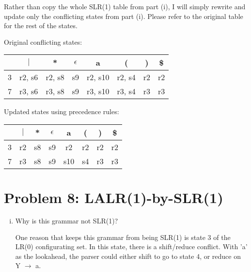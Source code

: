 \documentclass{article}
\begin{document}
\begin{enumerate}[i.]
		Rather than copy the whole SLR(1) table from part (i), I will
		simply rewrite and update only the conflicting states from part
		(i). Please refer to the original table for the rest of the
		states.

		Original conflicting states:

		\begin{tabular}{|c|c|c|c|c|c|c|c|}
			                                                                     \hline
			   &  $|$   &  *     & $\epsilon$ &   a      &  (     &   ) &  \$ \\ \hline
			3  & r2, s6 & r2, s8 &     s9     &  r2, s10 & r2, s4 &  r2 &  r2 \\ \hline
			7  & r3, s6 & r3, s8 &     s9     &  r3, s10 & r3, s4 &  r3 &  r3 \\ \hline
		\end{tabular}

		Updated states using precedence rules:

		\begin{tabular}{|c|c|c|c|c|c|c|c|}
			                                                                     \hline
			   & $|$ &  * & $\epsilon$ &   a &  ( &  ) & \$ \\ \hline
			3  &  r2 & s8 &     s9     &  r2 & r2 & r2 & r2 \\ \hline
			7  &  r3 & s8 &     s9     & s10 & s4 & r3 & r3 \\ \hline
		\end{tabular}
\end{enumerate}

\section{Problem 8: LALR(1)-by-SLR(1)}

\begin{enumerate}[i.]
	\item Why is this grammar not SLR(1)?

		One reason that keeps this grammar from being SLR(1) is state 3
		of the LR(0) configurating set. In this state, there is a
		shift/reduce conflict. With 'a' as the lookahead, the parser
		could either shift to go to state 4, or reduce on Y $\to$ a.
\end{enumerate}
\end{document}
